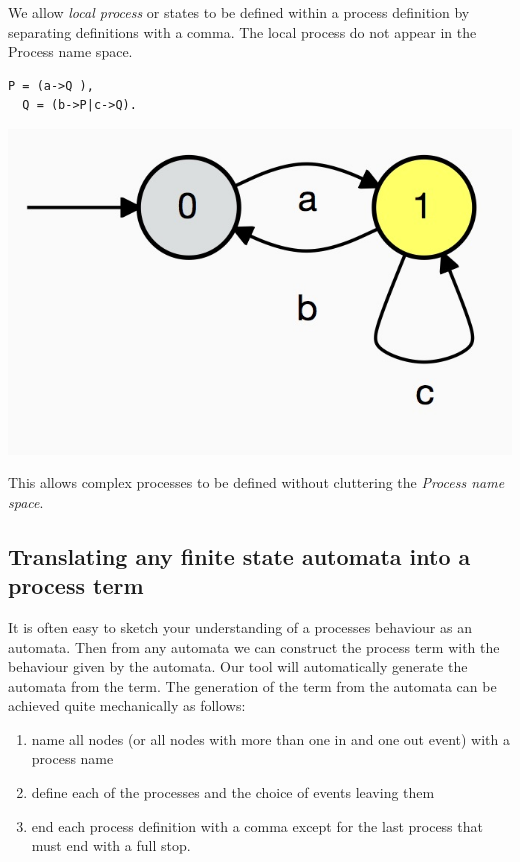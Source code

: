 \documentclass[]{article}
\begin{document}
  We allow \emph{local process} or states to be defined within a process  definition by separating definitions with a comma. The local process do not appear in the Process name space.

\begin{center}\begin{minipage}{0.25\textwidth}
\begin{verbatim}
P = (a->Q ),
  Q = (b->P|c->Q).
\end{verbatim} 
\end{minipage}
\begin{minipage}{0.25\textwidth}\includegraphics[scale=0.15]{P.jpg}
\end{minipage}
\end{center}
This allows complex processes to be defined without cluttering the \emph{Process name space}.

\subsection{Translating any finite state automata  into a process term}
It is often easy to   sketch  your understanding of a processes behaviour as an automata. Then from any automata  we can construct  the  process term with  the behaviour given by the automata.  Our tool  will automatically generate  the automata from the term.  The generation of the term from the automata  can be achieved quite mechanically as follows:

\begin{enumerate}
\item name all nodes (or all nodes with more than one in and one out event) with a process name
\item define each of the processes and the choice of events leaving them
\item end each process definition with a comma except for the last process that must end with a full stop.
\end{enumerate}
\end{document}
